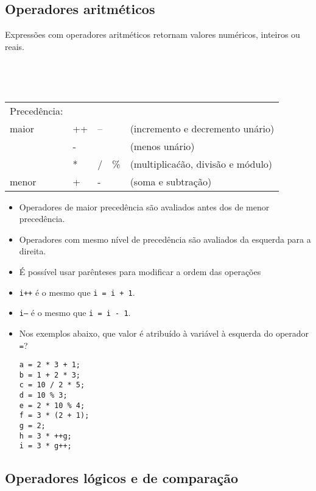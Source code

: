 \documentclass{book}
\begin{document}
\subsection{Operadores aritméticos}

Expressões com operadores aritméticos retornam valores numéricos, inteiros ou reais.

~\\

{\tt
\begin{tabular}{|l|llll|}
\hline
Precedência:        &    &    &     &                                    \\
maior               & ++ & -- &     & (incremento e decremento unário)   \\
                    & -  &    &     & (menos unário)                     \\
                    & *  & /  & \%  & (multiplicaćão, divisão e módulo)  \\
menor               & +  & -  &     & (soma e subtração)                 \\
\hline
\end{tabular}
}

\begin{itemize}

\item Operadores de maior precedência são avaliados antes dos de menor precedência.
\item Operadores com mesmo nível de precedência são avaliados da esquerda para a direita.
\item É possível usar parênteses para modificar a ordem das operações
\item {\tt i++} é o mesmo que {\tt i = i + 1}.
\item {\tt i--} é o mesmo que {\tt i = i - 1}.

\item Nos exemplos abaixo, que valor é atribuído à variável à esquerda do operador {\tt =}?

\begin{lstlisting}
a = 2 * 3 + 1;
b = 1 + 2 * 3;
c = 10 / 2 * 5;
d = 10 % 3;
e = 2 * 10 % 4;
f = 3 * (2 + 1);
g = 2;
h = 3 * ++g;
i = 3 * g++;
\end{lstlisting}

\end{itemize}

\subsection{Operadores lógicos e de comparação}
\end{document}
